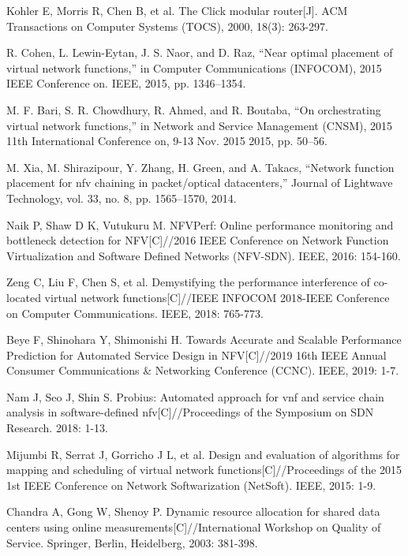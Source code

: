\documentclass{ieeeaccess}
\begin{document}
\begin{thebibliography}{00}
 Kohler E, Morris R, Chen B, et al. The Click modular router[J]. ACM Transactions on Computer Systems (TOCS), 2000, 18(3): 263-297.

 R. Cohen, L. Lewin-Eytan, J. S. Naor, and D. Raz, “Near optimal placement of virtual network functions,” in Computer Communications (INFOCOM), 2015 IEEE Conference on. IEEE, 2015, pp. 1346–1354.

 M. F. Bari, S. R. Chowdhury, R. Ahmed, and R. Boutaba, “On orchestrating virtual network functions,” in Network and Service Management (CNSM), 2015 11th International Conference on, 9-13 Nov. 2015 2015, pp. 50–56.

 M. Xia, M. Shirazipour, Y. Zhang, H. Green, and A. Takacs, “Network function placement for nfv chaining in packet/optical datacenters,” Journal of Lightwave Technology, vol. 33, no. 8, pp. 1565–1570, 2014.

 Naik P, Shaw D K, Vutukuru M. NFVPerf: Online performance monitoring and bottleneck detection for NFV[C]//2016 IEEE Conference on Network Function Virtualization and Software Defined Networks (NFV-SDN). IEEE, 2016: 154-160.

 Zeng C, Liu F, Chen S, et al. Demystifying the performance interference of co-located virtual network functions[C]//IEEE INFOCOM 2018-IEEE Conference on Computer Communications. IEEE, 2018: 765-773.

 Beye F, Shinohara Y, Shimonishi H. Towards Accurate and Scalable Performance Prediction for Automated Service Design in NFV[C]//2019 16th IEEE Annual Consumer Communications \& Networking Conference (CCNC). IEEE, 2019: 1-7.

 Nam J, Seo J, Shin S. Probius: Automated approach for vnf and service chain analysis in software-defined nfv[C]//Proceedings of the Symposium on SDN Research. 2018: 1-13.

 Mijumbi R, Serrat J, Gorricho J L, et al. Design and evaluation of algorithms for mapping and scheduling of virtual network functions[C]//Proceedings of the 2015 1st IEEE Conference on Network Softwarization (NetSoft). IEEE, 2015: 1-9.

 Chandra A, Gong W, Shenoy P. Dynamic resource allocation for shared data centers using online measurements[C]//International Workshop on Quality of Service. Springer, Berlin, Heidelberg, 2003: 381-398.

\end{thebibliography}




\EOD
\end{document}
